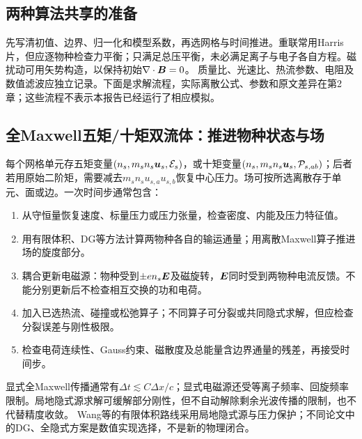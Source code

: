 \documentclass[UTF8,a4paper,11pt,openany,fontset=fandol]{ctexbook}
\begin{document}
\subsection{两种算法共享的准备}
先写清初值、边界、归一化和模型系数，再选网格与时间推进。重联常用Harris片，但应逐物种检查力平衡；只满足总压平衡，未必满足离子与电子各自方程。磁扰动可用矢势构造，以保持初始$\nabla\cdot\bm{B}=0$。
质量比、光速比、热流参数、电阻及数值滤波应独立记录。下面是求解流程，实际离散公式、参数和原文差异在第2章；这些流程不表示本报告已经运行了相应模拟。\citep{Birn2001,Wang2015}

\subsection{全Maxwell五矩/十矩双流体：推进物种状态与场}
每个网格单元存五矩变量$(n_s,m_sn_s\bm{u}_s,\mathcal E_s)$，或十矩变量$(n_s,m_sn_s\bm{u}_s,\mathcal P_{s,ab})$；后者若用原始二阶矩，需要减去$m_sn_su_{s,a}u_{s,b}$恢复中心压力。场可按所选离散存于单元、面或边。一次时间步通常包含：
\begin{enumerate}
\item 从守恒量恢复速度、标量压力或压力张量，检查密度、内能及压力特征值。
\item 用有限体积、DG等方法计算两物种各自的输运通量；用离散Maxwell算子推进场的旋度部分。
\item 耦合更新电磁源：物种受到$\pm en_s\bm{E}$及磁旋转，$\bm{E}$同时受到两物种电流反馈。不能分别更新后不检查相互交换的功和电荷。
\item 加入已选热流、碰撞或松弛算子；不同算子可分裂或共同隐式求解，但应检查分裂误差与刚性极限。
\item 检查电荷连续性、Gauss约束、磁散度及总能量含边界通量的残差，再接受时间步。
\end{enumerate}
显式全Maxwell传播通常有$\Delta t\lesssim C\Delta x/c$；显式电磁源还受等离子频率、回旋频率限制。局地隐式源求解可缓解部分刚性，但不自动解除剩余光波传播的限制，也不代替精度收敛。
Wang等的有限体积路线采用局地隐式源与压力保护；不同论文中的DG、全隐式方案是数值实现选择，不是新的物理闭合。\citep{Wang2015,Hakim2008}
\end{document}
